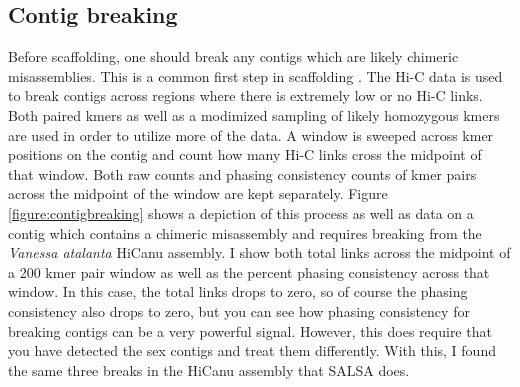 {\subsection{Contig breaking}

\par{
Before scaffolding, one should break any contigs which are likely chimeric misassemblies. This is a common first step in scaffolding \cite{SALSA}\cite{scaffoldingreview}. The Hi-C data is used to break contigs across regions where there is extremely low or no Hi-C links. Both paired kmers as well as a modimized sampling of likely homozygous kmers are used in order to utilize more of the data. A window is sweeped across kmer positions on the contig and count how many Hi-C links cross the midpoint of that window. Both raw counts and phasing consistency counts of kmer pairs across the midpoint of the window are kept separately. Figure \ref{figure:contigbreaking} shows a depiction of this process as well as data on a contig which contains a chimeric misassembly and requires breaking from the \textit{Vanessa atalanta} HiCanu assembly. I show both total links across the midpoint of a 200 kmer pair window as well as the percent phasing consistency across that window. In this case, the total links drops to zero, so of course the phasing consistency also drops to zero, but you can see how phasing consistency for breaking contigs can be a very powerful signal. However, this does require that you have detected the sex contigs and treat them differently. With this, I found the same three breaks in the HiCanu assembly that SALSA does.
}

}
